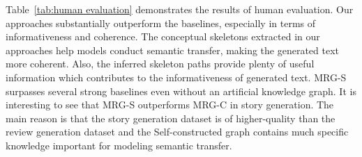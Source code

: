 \documentclass[letterpaper]{article} %
\begin{document}
Table~\ref{tab:human evaluation} demonstrates the results of human evaluation. Our approaches substantially outperform the baselines, especially in terms of informativeness and coherence. 
The conceptual skeletons extracted in our approaches help models conduct semantic transfer, making the generated text more coherent. Also, the inferred skeleton paths provide plenty of useful information which contributes to the informativeness of generated text.
MRG-S surpasses several strong baselines even without an artificial knowledge graph. It is interesting to see that MRG-S outperforms MRG-C in story generation. The main reason is that the story generation dataset is of higher-quality than the review  generation dataset and the Self-constructed graph contains much specific knowledge important for modeling semantic transfer.

\end{document}
